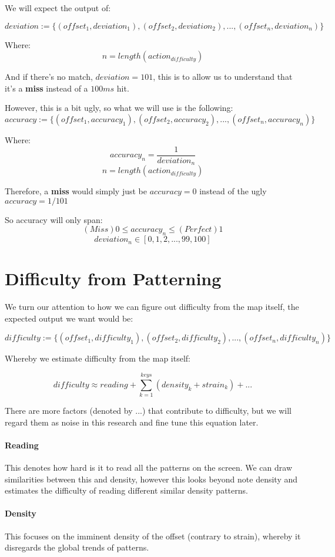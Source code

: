\documentclass{article}
\begin{document}
We will expect the output of:

$$ deviation := \lbrace(offset_1, deviation_1), (offset_2, deviation_2), ..., (offset_n, deviation_n)\rbrace $$

Where:
$$ n = length(action_{difficulty}) $$

And if there's no match, $deviation = 101$, this is to allow us to understand that it's a \textbf{miss} instead of a $100ms$ hit.

However, this is a bit ugly, so what we will use is the following:
$$ accuracy := \lbrace(offset_1, accuracy_1), (offset_2, accuracy_2), ..., (offset_n, accuracy_n)\rbrace $$

Where:
$$ accuracy_n = \frac{1}{deviation_n} $$
$$ n = length(action_{difficulty}) $$

Therefore, a \textbf{miss} would simply just be $accuracy = 0$ instead of the ugly $accuracy = 1/101$

So accuracy will only span:
$$ (Miss) 0 \leq accuracy_n \leq (Perfect) 1 $$
$$ deviation_n \in [0, 1, 2, ..., 99, 100] $$

\section{Difficulty from Patterning}

We turn our attention to how we can figure out difficulty from the map itself, the expected output we want would be:

$$ difficulty := \lbrace(offset_1, difficulty_1), (offset_2, difficulty_2), ..., (offset_n, difficulty_n)\rbrace $$

Whereby we estimate difficulty from the map itself:

$$ difficulty \approx reading + \sum_{k=1}^{keys} \left( density_k + strain_k \right) + ... $$

There are more factors (denoted by $...$) that contribute to difficulty, but we will regard them as noise in this research and fine tune this equation later.

\paragraph{Reading} This denotes how hard is it to read all the patterns on the screen. We can draw similarities between this and density, however this looks beyond note density and estimates the difficulty of reading different similar density patterns.

\paragraph{Density} This focuses on the imminent density of the offset (contrary to strain), whereby it disregards the global trends of patterns.
\end{document}
